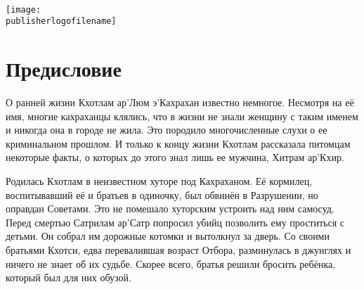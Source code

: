 % 


\begin{titlepage}
{
\centering
{~\par}
\vspace{0.25\textheight}
{\LARGE\bookauthor\par}
\vspace{1.3cm}
{\Huge\textbf{\booktitle}\par}
\vfill
{\texttt{[image: \\publisherlogofilename]}\par}
}
\end{titlepage}


\tableofcontents

\pagestyle{fancy}

\chapter{Предисловие}

О ранней жизни Кхотлам ар'Люм э'Кахрахан известно немногое.
Несмотря на её имя, многие кахраханцы клялись, что в жизни не знали женщину с таким именем и никогда она в городе не жила.
Это породило многочисленные слухи о ее криминальном прошлом.
И только к концу жизни Кхотлам рассказала питомцам некоторые факты, о которых до этого знал лишь ее мужчина, Хитрам ар'Кхир.

Родилась Кхотлам в неизвестном хуторе под Кахраханом.
Её кормилец, воспитывавший её и братьев в одиночку, был обвинён в Разрушении, но оправдан Советами.
Это не помешало хуторским устроить над ним самосуд.
Перед смертью Сатрилам ар'Сатр попросил убийц позволить ему проститься с детьми.
Он собрал им дорожные котомки и вытолкнул за дверь.
Со своими братьями Кхотси, едва перевалившая возраст Отбора, разминулась в джунглях и ничего не знает об их судьбе.
Скорее всего, братья решили бросить ребёнка, который был для них обузой.

